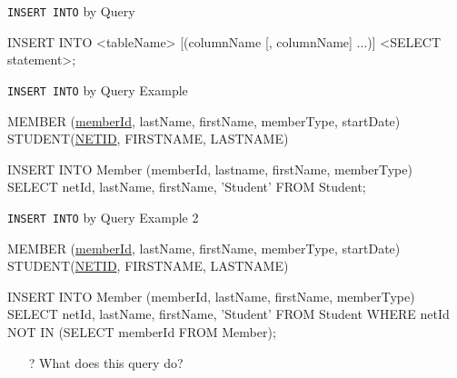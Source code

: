 \documentclass[aspectratio=169]{beamer}
\begin{document}
\begin{frame}[fragile]{\texttt{INSERT INTO} by Query}

\begin{SQL}
INSERT INTO <tableName> [(columnName [, columnName] $\ldots$)] 
	<SELECT statement>;
\end{SQL}

\end{frame}
\begin{frame}[fragile]{\texttt{INSERT INTO} by Query Example}

MEMBER (\underline{memberId}, lastName, firstName, memberType, startDate)
STUDENT(\underline{NETID}, FIRSTNAME, LASTNAME)\\

\begin{SQL}
INSERT INTO Member (memberId, lastname, firstName, memberType)
	SELECT netId, lastName, firstName, 'Student' 
	FROM Student;
\end{SQL}


\end{frame}
\begin{frame}[fragile]{\texttt{INSERT INTO} by Query Example 2}

MEMBER (\underline{memberId}, lastName, firstName, memberType, startDate)
STUDENT(\underline{NETID}, FIRSTNAME, LASTNAME)\\

\begin{SQL}
INSERT INTO Member (memberId, lastName, firstName, memberType)
	SELECT netId, lastName, firstName, 'Student' 
	FROM Student
	WHERE netId NOT IN 
		(SELECT memberId FROM Member);
\end{SQL}

\begin{itemize}
\item[?] What does this query do?
\end{itemize}

\end{frame}
\end{document}
